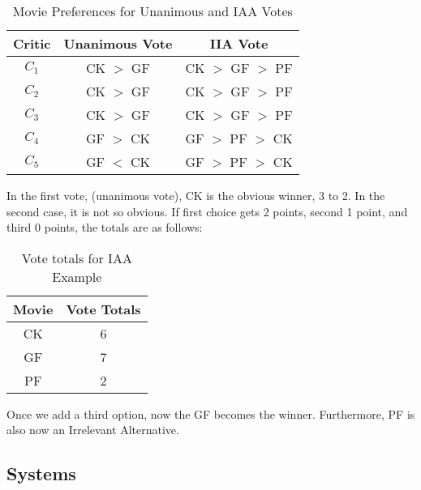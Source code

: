 \documentclass[twoside]{article}
\begin{document}
\begin{table}[H]
    \centering
     \begin{tabular}{c|c|c}
     Critic & Unanimous Vote & IIA Vote \\ \hline
     $C_1$ & CK $>$ GF & CK $>$ GF $>$ PF \\
     $C_2$ & CK $>$ GF & CK $>$ GF $>$ PF \\
     $C_3$ & CK $>$ GF & CK $>$ GF $>$ PF \\
     $C_4$ & GF $>$ CK & GF $>$ PF $>$ CK \\
     $C_5$ & GF $<$ CK & GF $>$ PF $>$ CK 
    \end{tabular}
    \caption{Movie Preferences for Unanimous and IAA Votes}
    \label{tab:ex7}
\end{table}


In the first vote, (unanimous vote), CK is the obvious winner, 3 to 2.  In the second case, it is not so obvious.  If first choice gets 2 points, second 1 point, and third 0 points, the totals are as follows:

\begin{table}[H]
    \centering
     \begin{tabular}{c|c}
        Movie & Vote Totals \\ \hline
        CK & 6 \\
        GF & 7 \\
        PF & 2
    \end{tabular}
    \caption{Vote totals for IAA Example}
    \label{tab:ex8}
\end{table}


Once we add a third option, now the GF becomes the winner.  Furthermore, PF is also now an Irrelevant Alternative.

\subsection{Systems}

\newcommand{\xmark}{\textcolor{red}{\ding{55}}}%
\newcommand{\cmark}{\textcolor{green}{\ding{51}}}%
\end{document}
